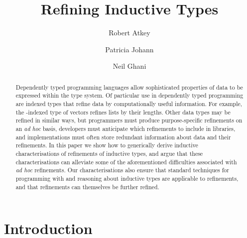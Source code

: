 \documentclass{LMCS}
\begin{document}
\title[Refining Inductive Types]{Refining Inductive Types}

\author[R.~Atkey]{Robert Atkey}
\address{University of Strathclyde, UK}

\author[P.~Johann]{Patricia Johann}


\author[N.~Ghani]{Neil Ghani}



\begin{abstract}
  Dependently typed programming languages allow sophisticated
  properties of data to be expressed within the type system. Of
  particular use in dependently typed programming are indexed types
  that refine data by computationally useful information.  For
  example, the -indexed type of vectors refines lists by
  their lengths. Other data types may be refined in similar ways, but
  programmers must produce purpose-specific refinements on an {\em ad
    hoc} basis, developers must anticipate which refinements to
  include in libraries, and implementations must often store redundant
  information about data and their refinements. In this paper we show
  how to generically derive inductive characterisations of refinements
  of inductive types, and argue that these characterisations can
  alleviate some of the aforementioned difficulties associated with
  {\em ad hoc} refinements. Our characterisations also ensure that
  standard techniques for programming with and reasoning about
  inductive types are applicable to refinements, and that refinements
  can themselves be further refined.
\end{abstract}

\maketitle

\section{Introduction}\label{sec:introduction}
\end{document}
